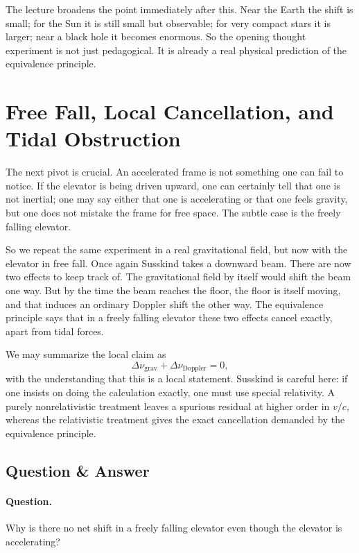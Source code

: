 The lecture broadens the point immediately after this. Near the Earth the shift is small; for the Sun it is still small but observable; for very compact stars it is larger; near a black hole it becomes enormous. So the opening thought experiment is not just pedagogical. It is already a real physical prediction of the equivalence principle.

\section{Free Fall, Local Cancellation, and Tidal Obstruction}

The next pivot is crucial. An accelerated frame is not something one can fail to notice. If the elevator is being driven upward, one can certainly tell that one is not inertial; one may say either that one is accelerating or that one feels gravity, but one does not mistake the frame for free space. The subtle case is the freely falling elevator.

So we repeat the same experiment in a real gravitational field, but now with the elevator in free fall. Once again Susskind takes a downward beam. There are now two effects to keep track of. The gravitational field by itself would shift the beam one way. But by the time the beam reaches the floor, the floor is itself moving, and that induces an ordinary Doppler shift the other way. The equivalence principle says that in a freely falling elevator these two effects cancel exactly, apart from tidal forces.

We may summarize the local claim as
\begin{equation}
\Delta \nu_{\text{grav}}+\Delta \nu_{\text{Doppler}}=0,
\end{equation}
with the understanding that this is a local statement. Susskind is careful here: if one insists on doing the calculation exactly, one must use special relativity. A purely nonrelativistic treatment leaves a spurious residual at higher order in \(v/c\), whereas the relativistic treatment gives the exact cancellation demanded by the equivalence principle.

\subsection{Question \& Answer}

\paragraph{Question.} Why is there no net shift in a freely falling elevator even though the elevator is accelerating?

